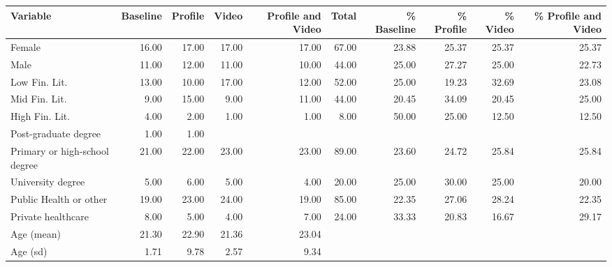 \begin{tabular}{lrrrrrrrrr}
  \hline
Variable & Baseline & Profile & Video & Profile and Video & Total & \% Baseline & \% Profile & \% Video & \% Profile and Video \\ 
  \hline
Female & 16.00 & 17.00 & 17.00 & 17.00 & 67.00 & 23.88 & 25.37 & 25.37 & 25.37 \\ 
  Male & 11.00 & 12.00 & 11.00 & 10.00 & 44.00 & 25.00 & 27.27 & 25.00 & 22.73 \\ 
  Low Fin. Lit. & 13.00 & 10.00 & 17.00 & 12.00 & 52.00 & 25.00 & 19.23 & 32.69 & 23.08 \\ 
  Mid Fin. Lit. & 9.00 & 15.00 & 9.00 & 11.00 & 44.00 & 20.45 & 34.09 & 20.45 & 25.00 \\ 
  High Fin. Lit. & 4.00 & 2.00 & 1.00 & 1.00 & 8.00 & 50.00 & 25.00 & 12.50 & 12.50 \\ 
  Post-graduate degree & 1.00 & 1.00 &  &  &  &  &  &  &  \\ 
  Primary or high-school degree & 21.00 & 22.00 & 23.00 & 23.00 & 89.00 & 23.60 & 24.72 & 25.84 & 25.84 \\ 
  University degree & 5.00 & 6.00 & 5.00 & 4.00 & 20.00 & 25.00 & 30.00 & 25.00 & 20.00 \\ 
  Public Health or other & 19.00 & 23.00 & 24.00 & 19.00 & 85.00 & 22.35 & 27.06 & 28.24 & 22.35 \\ 
  Private healthcare & 8.00 & 5.00 & 4.00 & 7.00 & 24.00 & 33.33 & 20.83 & 16.67 & 29.17 \\ 
  Age (mean) & 21.30 & 22.90 & 21.36 & 23.04 &  &  &  &  &  \\ 
  Age (sd) & 1.71 & 9.78 & 2.57 & 9.34 &  &  &  &  &  \\ 
   \hline
\end{tabular}
